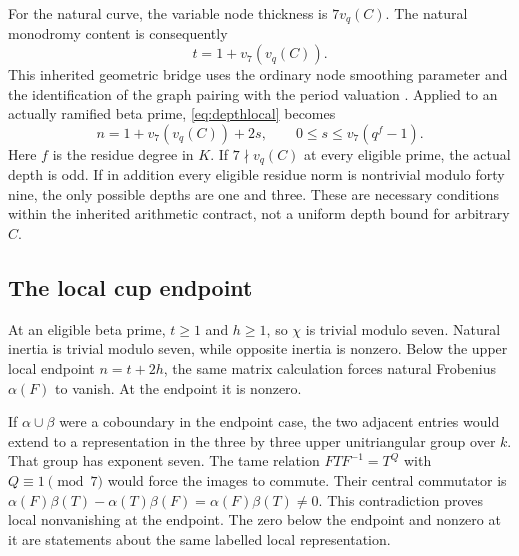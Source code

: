For the natural curve, the variable node thickness is $7v_q(C)$. The natural monodromy content is consequently
\[
t=1+v_7(v_q(C)).
\]
This inherited geometric bridge uses the ordinary node smoothing parameter and the identification of the graph pairing with the period valuation \cite{baker-rabinoff2013}. Applied to an actually ramified beta prime, \eqref{eq:depthlocal} becomes
\begin{equation}\label{eq:arithdepth}
n=1+v_7(v_q(C))+2s,\qquad0\le s\le v_7(q^f-1).
\end{equation}
Here $f$ is the residue degree in $K$. If $7\nmid v_q(C)$ at every eligible prime, the actual depth is odd. If in addition every eligible residue norm is nontrivial modulo forty nine, the only possible depths are one and three. These are necessary conditions within the inherited arithmetic contract, not a uniform depth bound for arbitrary $C$.

\subsection{The local cup endpoint}
At an eligible beta prime, $t\ge1$ and $h\ge1$, so $\chi$ is trivial modulo seven. Natural inertia is trivial modulo seven, while opposite inertia is nonzero. Below the upper local endpoint $n=t+2h$, the same matrix calculation forces natural Frobenius $\alpha(F)$ to vanish. At the endpoint it is nonzero.

If $\alpha\cup\beta$ were a coboundary in the endpoint case, the two adjacent entries would extend to a representation in the three by three upper unitriangular group over $k$. That group has exponent seven. The tame relation $FTF^{-1}=T^Q$ with $Q\equiv1\pmod7$ would force the images to commute. Their central commutator is $\alpha(F)\beta(T)-\alpha(T)\beta(F)=\alpha(F)\beta(T)\ne0$. This contradiction proves local nonvanishing at the endpoint. The zero below the endpoint and nonzero at it are statements about the same labelled local representation.
